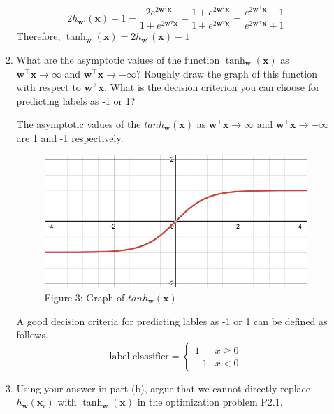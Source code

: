 \documentclass[letterpaper]{article}
\theoremstyle{definition}
\begin{document}
\begin{enumerate}
\begin{enumerate}
$$
      2h_{\mathbf{w}'}(\mathbf{x}) - 1 = \frac{2e^{2\mathbf{w}^T\mathbf{x}}}{1 + e^{2\mathbf{w}^T\mathbf{x}}} -
      \frac{1 + e^{2\mathbf{w}^T\mathbf{x}}}{1 + e^{2\mathbf{w}^T\mathbf{x}}}
      = \frac{e^{2 \mathbf{w}^{\top} \mathbf{x}}-1}{e^{2 \mathbf{w}^{\top} \mathbf{x}}+1}
      $$
Therefore, \(\tanh _{\mathbf{w}}(\mathbf{x})=2 h_{\mathbf{w}^{\prime}}(\mathbf{x})-1\)

\color{black}

\item What are the asymptotic values of the function \(\tanh _{\mathbf{w}}(\mathbf{x})\) as \(\mathbf{w}^{\top} \mathbf{x} \rightarrow \infty\) and \(\mathbf{w}^{\top} \mathbf{x} \rightarrow-\infty\)? Roughly draw the graph of this function with respect to \(\mathbf{w}^{\top} \mathbf{x}\). What is the decision criterion you can choose for predicting labels as -1 or 1?

\color{teal}
The asymptotic values of the \(tanh_{\mathbf{w}}(\mathbf{x})\) as
\(\mathbf{w}^{\top} \mathbf{x} \rightarrow \infty\) and
\(\mathbf{w}^{\top} \mathbf{x} \rightarrow-\infty\) are 1 and -1 respectively.

\begin{figure}[htbp]
\centering
\includegraphics[width=400]{../assets/hw1_fig3.png}
\caption{Figure 3: Graph of \(tanh_{\mathbf{w}}(\mathbf{x})\)}
\end{figure}

A good decision criteria for predicting lables as -1 or 1 can be defined as follows.
$$\text{label classifier} = \begin{cases}1 & x \ge 0 \\ -1 & x < 0 \end{cases}$$

\color{black}

\item Using your answer in part (b), argue that we cannot directly replace \(h_{\mathbf{w}}\left(\mathbf{x}_{i}\right)\) with \(\tanh _{\mathbf{w}}(\mathbf{x})\) in the optimization problem P2.1.


\end{enumerate}
\end{enumerate}
\end{document}
